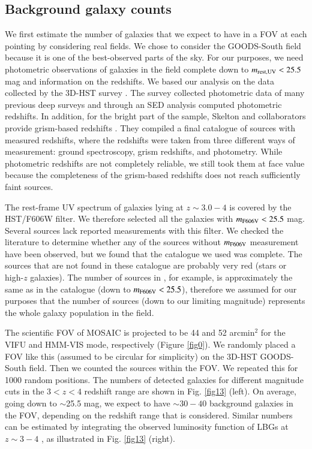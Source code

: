 \documentclass{aa}
\begin{document}
\subsection{Background galaxy counts}

We first estimate the number of galaxies that we expect to have in a FOV at each pointing by considering real fields. We chose to consider the GOODS-South field \citep{Giavalisco2004} because it is one of the best-observed parts of the sky. For our purposes, we need photometric observations of galaxies in the field complete down to $m_{\rm rest,UV} < 25.5$ mag and information on the redshifts. We based our analysis on the data collected by the 3D-HST survey \citep{Skelton2014}. The survey collected photometric data of many previous deep surveys and through an SED analysis computed photometric redshifts. In addition, for the bright part of the sample, Skelton and collaborators provide grism-based redshifts \citep{Momcheva2016}. They compiled a final catalogue of sources with measured redshifts, where the redshifts were taken from three different ways of measurement: ground spectroscopy, grism redshifts, and photometry. While photometric redshifts are not completely reliable, we still took them at face value because the completeness of the grism-based redshifts does not reach sufficiently faint sources.

The rest-frame UV spectrum of galaxies lying at $z \sim 3.0 - 4$ is covered by the HST/F606W filter. We therefore selected all the galaxies with $m_{\rm F606V} < 25.5$ mag. Several sources lack reported measurements with this filter. We checked the literature to determine whether any of the sources without $m_{\rm F606V}$ measurement have been observed, but we found that the catalogue we used was complete. The sources that are not found in these catalogue are probably very red (stars or high-$z$ galaxies). The number of sources in \citet{Guo2013}, for example, is approximately the same as in the \citet{Momcheva2016} catalogue (down to $m_{\rm F606V} < 25.5$), therefore we assumed for our purposes that the number of sources (down to our limiting magnitude) represents the whole galaxy population in the field.

The scientific FOV of MOSAIC is projected to be 44 and  52 arcmin$^2$ for the VIFU and HMM-VIS mode, respectively (Figure \ref{fig0}). We randomly placed a FOV like this (assumed to be circular for simplicity) on the 3D-HST GOODS-South field. Then we counted the sources within the FOV. We repeated this for 1000 random positions. The numbers of detected galaxies for different magnitude cuts in the $3 < z < 4$ redshift range are shown in Fig. \ref{fig13} (left). On average, going down to $\sim$25.5 mag, we expect to have $\sim 30-40$ background galaxies in the FOV, depending on the redshift range that is considered. Similar numbers can be estimated by integrating the observed luminosity function of LBGs at $z \sim 3 - 4$ \citep{Reddy2009,Bouwens2015}, as illustrated in Fig. \ref{fig13} (right).
\end{document}

